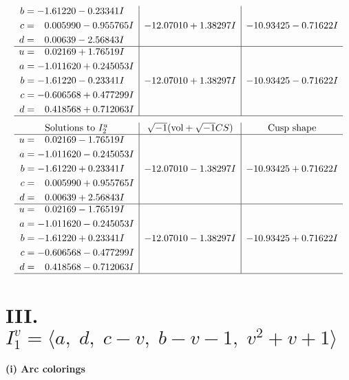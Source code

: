 \documentclass[1p]{elsarticle_modified}
\theoremstyle{definition}
\newcommand{\I}{\sqrt{-1}}
\begin{document}
$$\begin{array}{c|c|c}
\begin{aligned}
b &= -1.61220 - 0.23341 I \\
c &= \phantom{-}0.005990 - 0.955765 I \\
d &= \phantom{-}0.00639 - 2.56843 I\end{aligned}
 & -12.07010 + 1.38297 I & -10.93425 - 0.71622 I \\ \hline\begin{aligned}
u &= \phantom{-}0.02169 + 1.76519 I \\
a &= -1.011620 + 0.245053 I \\
b &= -1.61220 - 0.23341 I \\
c &= -0.606568 + 0.477299 I \\
d &= \phantom{-}0.418568 + 0.712063 I\end{aligned}
 & -12.07010 + 1.38297 I & -10.93425 - 0.71622 I\\
 \hline 
 \end{array}$$\newpage$$\begin{array}{c|c|c}  
\text{Solutions to }I^u_{2}& \I (\text{vol} + \sqrt{-1}CS) & \text{Cusp shape}\\
 \hline 
\begin{aligned}
u &= \phantom{-}0.02169 - 1.76519 I \\
a &= -1.011620 - 0.245053 I \\
b &= -1.61220 + 0.23341 I \\
c &= \phantom{-}0.005990 + 0.955765 I \\
d &= \phantom{-}0.00639 + 2.56843 I\end{aligned}
 & -12.07010 - 1.38297 I & -10.93425 + 0.71622 I \\ \hline\begin{aligned}
u &= \phantom{-}0.02169 - 1.76519 I \\
a &= -1.011620 - 0.245053 I \\
b &= -1.61220 + 0.23341 I \\
c &= -0.606568 - 0.477299 I \\
d &= \phantom{-}0.418568 - 0.712063 I\end{aligned}
 & -12.07010 - 1.38297 I & -10.93425 + 0.71622 I\\
 \hline 
 \end{array}$$\newpage\newpage\renewcommand{\arraystretch}{1}
\centering \section*{III. $I^v_{1}= \langle a,\;d,\;c- v,\;b- v-1,\;v^2+v+1 \rangle$}
\flushleft \textbf{(i) Arc colorings}\\
\end{document}
